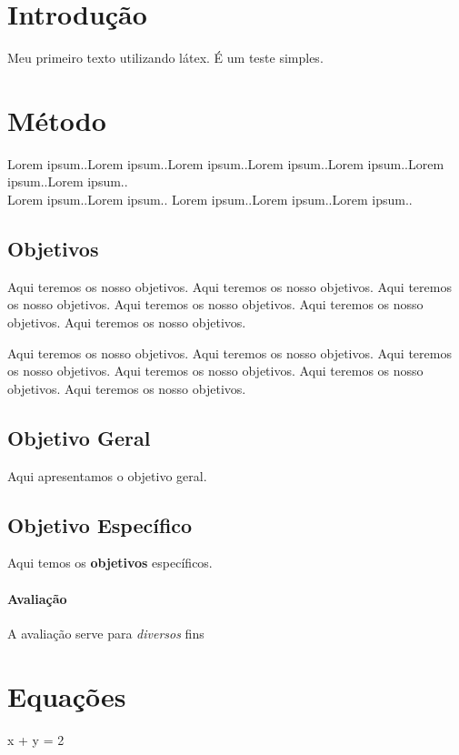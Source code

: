 \documentclass{article}
\begin{document}
\tableofcontents
\newpage %

\section{Introdução}
Meu primeiro texto utilizando látex. É um teste simples.

\section{Método}

Lorem ipsum..Lorem ipsum..Lorem ipsum..Lorem ipsum..Lorem ipsum..Lorem ipsum..Lorem ipsum..\\ %
Lorem ipsum..Lorem ipsum.. Lorem ipsum..Lorem ipsum..Lorem ipsum..
\subsection{Objetivos}
Aqui teremos os nosso objetivos. Aqui teremos os nosso objetivos. Aqui teremos os nosso objetivos. Aqui teremos os nosso objetivos. Aqui teremos os nosso objetivos. Aqui teremos os nosso objetivos.


Aqui teremos os nosso objetivos. Aqui teremos os nosso objetivos. Aqui teremos os nosso objetivos. Aqui teremos os nosso objetivos. Aqui teremos os nosso objetivos. Aqui teremos os nosso objetivos.

\subsection{Objetivo Geral}
Aqui apresentamos o objetivo geral.

\subsection{Objetivo Específico}
Aqui temos os \textbf{objetivos} específicos.

\paragraph{Avaliação}\label{sec:avaliacao}
A avaliação serve para \emph{diversos} fins

\section{Equações}
x + y = 2
\end{document}
